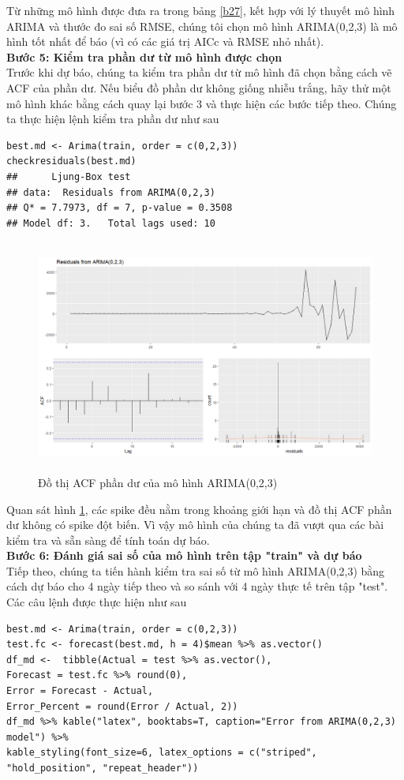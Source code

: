 \documentclass[12pt, a4paper,oneside]{book}
\theoremstyle{definition}
\begin{document}
Từ những mô hình được đưa ra trong bảng \ref{b27}, kết hợp với lý thuyết mô hình ARIMA và thước đo sai số RMSE, chúng tôi chọn mô hình ARIMA(0,2,3) là mô hình tốt nhất để báo (vì có các giá trị AICc và RMSE nhỏ nhất).\\ 
\textbf{Bước 5: Kiểm tra phần dư từ mô hình được chọn}\\
Trước khi dự báo, chúng ta kiểm tra phần dư từ mô hình đã chọn bằng cách vẽ ACF của phần dư. Nếu biểu đồ phần dư không giống nhiễu trắng, hãy thử một mô hình khác bằng cách quay lại bước 3 và thực hiện các bước tiếp theo. Chúng ta thực hiện lệnh kiểm tra phần dư như sau
\begin{lstlisting}
best.md <- Arima(train, order = c(0,2,3))
checkresiduals(best.md)
##  	Ljung-Box test
## data:  Residuals from ARIMA(0,2,3)
## Q* = 7.7973, df = 7, p-value = 0.3508
## Model df: 3.   Total lags used: 10
\end{lstlisting}
\begin{figure}[!htb]
	\centering
	\includegraphics[width=1\linewidth,height=7.7cm]{anh/NT1}
	\vskip-4mm 
	\caption{Đồ thị ACF phần dư của mô hình ARIMA(0,2,3)}  
	\label{NT1}
\end{figure}
Quan sát hình \ref{NT1}, các spike đều nằm trong khoảng giới hạn và đồ thị ACF phần dư không có spike đột biến. Vì vậy mô hình của chúng ta đã vượt qua các bài kiểm tra và sẵn sàng để tính toán dự báo.\\
\textbf{Bước 6: Đánh giá sai số của mô hình trên tập "train" và dự báo}\\
Tiếp theo, chúng ta tiến hành kiểm tra sai số từ mô hình ARIMA(0,2,3) bằng cách dự báo cho 4 ngày tiếp theo và so sánh với 4 ngày thực tế trên tập "test". Các câu lệnh được thực hiện như sau
\begin{lstlisting}
best.md <- Arima(train, order = c(0,2,3))
test.fc <- forecast(best.md, h = 4)$mean %>% as.vector()
df_md <-  tibble(Actual = test %>% as.vector(), 
Forecast = test.fc %>% round(0), 
Error = Forecast - Actual,
Error_Percent = round(Error / Actual, 2))
df_md %>% kable("latex", booktabs=T, caption="Error from ARIMA(0,2,3) model") %>%
kable_styling(font_size=6, latex_options = c("striped", "hold_position", "repeat_header"))
\end{lstlisting}
\end{document}
